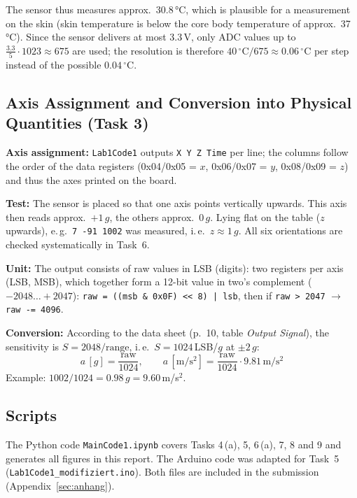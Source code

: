\documentclass[a4paper,oneside,10pt]{article}
\begin{document}
The sensor thus measures approx.\ 30.8\,°C, which is plausible for a measurement on the skin
(skin temperature is below the core body temperature of approx.\ 37\,°C).
Since the sensor delivers at most 3.3\,V, only ADC values up to
$\frac{3.3}{5}\cdot 1023 \approx 675$ are used; the resolution is therefore
$40\,^\circ\mathrm{C}/675 \approx 0.06\,^\circ$C per step instead of the possible
$0.04\,^\circ$C.

\subsection{Axis Assignment and Conversion into Physical Quantities (Task 3)}

\textbf{Axis assignment:} \texttt{Lab1Code1} outputs \texttt{X Y Z Time} per line;
the columns follow the order of the data registers (0x04/0x05 = $x$,
0x06/0x07 = $y$, 0x08/0x09 = $z$) and thus the axes printed on the board.

\textbf{Test:} The sensor is placed so that one axis points vertically upwards.
This axis then reads approx.\ $+1\,g$, the others approx.\ $0\,g$. Lying flat on the
table ($z$ upwards), e.\,g.\ \texttt{7 -91 1002} was measured, i.\,e.\ $z \approx 1\,g$.
All six orientations are checked systematically in Task~6.

\textbf{Unit:} The output consists of raw values in LSB (digits): two registers per axis
(LSB, MSB), which together form a 12-bit value in two's complement
($-2048 \ldots +2047$):
\texttt{raw = ((msb \& 0x0F) << 8) | lsb}, then if \texttt{raw > 2047}
$\rightarrow$ \texttt{raw -= 4096}.

\textbf{Conversion:} According to the data sheet \cite{bma400} (p.~10, table \emph{Output Signal}), the sensitivity is
$S = 2048/\text{range}$, i.\,e.\ $S = 1024$\,LSB/$g$ at $\pm 2\,g$:
\begin{equation}
  a\,[g] = \frac{\text{raw}}{1024}, \qquad
  a\,[\mathrm{m/s^2}] = \frac{\text{raw}}{1024}\cdot 9.81\,\mathrm{m/s^2}
\end{equation}
Example: $1002/1024 = 0.98\,g = 9.60$\,m/s$^2$.

\subsection{Scripts}

The Python code \texttt{MainCode1.ipynb} covers Tasks 4\,(a), 5,
6\,(a), 7, 8 and 9 and generates all figures in this report. The Arduino code
was adapted for Task~5 (\texttt{Lab1Code1\_modifiziert.ino}). Both files
are included in the submission (Appendix~\ref{sec:anhang}).
\end{document}
